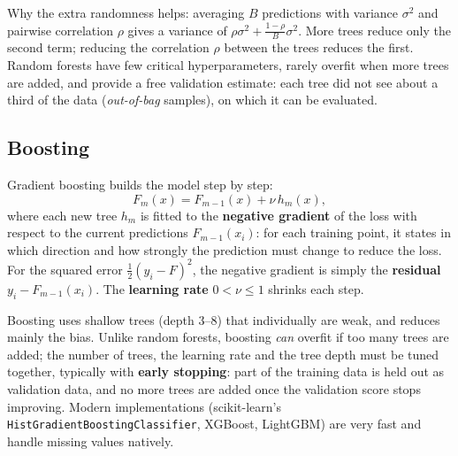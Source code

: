 \documentclass[
  letterpaper,
  DIV=11,
  numbers=noendperiod]{scrreprt}
\begin{document}
Why the extra randomness helps: averaging \(B\) predictions with
variance \(\sigma^2\) and pairwise correlation \(\rho\) gives a variance
of \(\rho\sigma^2 + \frac{1-\rho}{B}\sigma^2\). More trees reduce only
the second term; reducing the correlation \(\rho\) between the trees
reduces the first. Random forests have few critical hyperparameters,
rarely overfit when more trees are added, and provide a free validation
estimate: each tree did not see about a third of the data
(\emph{out-of-bag} samples), on which it can be evaluated.

\subsection{Boosting}\label{boosting}

\begin{tcolorbox}[enhanced jigsaw, left=2mm, title=\textcolor{quarto-callout-note-color}{\faInfo}\hspace{0.5em}{Definition: Gradient boosting}, opacityback=0, breakable, rightrule=.15mm, arc=.35mm, toptitle=1mm, colbacktitle=quarto-callout-note-color!10!white, opacitybacktitle=0.6, coltitle=black, colframe=quarto-callout-note-color-frame, bottomrule=.15mm, leftrule=.75mm, bottomtitle=1mm, titlerule=0mm, toprule=.15mm, colback=white]

Gradient boosting builds the model step by step:
\[F_m(x) = F_{m-1}(x) + \nu\, h_m(x),\] where each new tree \(h_m\) is
fitted to the \textbf{negative gradient} of the loss with respect to the
current predictions \(F_{m-1}(x_i)\): for each training point, it states
in which direction and how strongly the prediction must change to reduce
the loss. For the squared error \(\frac12 (y_i - F)^2\), the negative
gradient is simply the \textbf{residual} \(y_i - F_{m-1}(x_i)\). The
\textbf{learning rate} \(0 < \nu \le 1\) shrinks each step.

\end{tcolorbox}

Boosting uses shallow trees (depth 3--8) that individually are weak, and
reduces mainly the bias. Unlike random forests, boosting \emph{can}
overfit if too many trees are added; the number of trees, the learning
rate and the tree depth must be tuned together, typically with
\textbf{early stopping}: part of the training data is held out as
validation data, and no more trees are added once the validation score
stops improving. Modern implementations (scikit-learn's
\texttt{HistGradientBoostingClassifier}, XGBoost, LightGBM) are very
fast and handle missing values natively.
\end{document}
